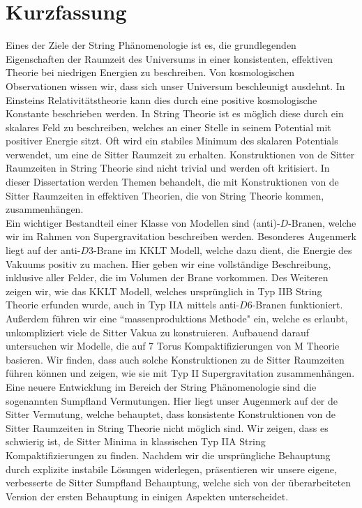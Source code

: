 \documentclass[a4paper,12pt,twoside,openright]{report}
\begin{document}
\newpage\thispagestyle{empty}\vspace*{\fill}
\null %
\vspace*{\fill}\newpage
\setcounter{page}{1}
\section*{Kurzfassung}
Eines der Ziele der String Phänomenologie ist es, die grundlegenden Eigenschaften der Raumzeit des Universums in einer konsistenten, effektiven Theorie bei niedrigen Energien zu beschreiben. Von kosmologischen Observationen wissen wir, dass sich unser Universum beschleunigt ausdehnt. In Einsteins Relativitätstheorie kann dies durch eine positive kosmologische Konstante beschrieben werden. In String Theorie ist es möglich diese durch ein skalares Feld zu beschreiben, welches an einer Stelle in seinem Potential mit positiver Energie sitzt. Oft wird ein stabiles Minimum des skalaren Potentials verwendet, um eine de Sitter Raumzeit zu erhalten. Konstruktionen von de Sitter Raumzeiten in String Theorie sind nicht trivial und werden oft kritisiert. In dieser Dissertation werden Themen behandelt, die mit Konstruktionen von de Sitter Raumzeiten in effektiven Theorien, die von String Theorie kommen, zusammenhängen.\\
Ein wichtiger Bestandteil einer Klasse von Modellen sind (anti)-$D$-Branen, welche wir im Rahmen von Supergravitation beschreiben werden. Besonderes Augenmerk liegt auf der anti-$D3$-Brane im KKLT Modell, welche dazu dient, die Energie des Vakuums positiv zu machen. Hier geben wir eine vollständige Beschreibung, inklusive aller Felder, die im Volumen der Brane vorkommen. Des Weiteren zeigen wir, wie das KKLT Modell, welches ursprünglich in Typ IIB String Theorie erfunden wurde, auch in Typ IIA mittels anti-$D6$-Branen funktioniert. Außerdem führen wir eine ``massenproduktions Methode" ein, welche es erlaubt, unkompliziert viele de Sitter Vakua zu konstruieren. Aufbauend darauf untersuchen wir Modelle, die auf 7 Torus Kompaktifizierungen von M Theorie basieren. Wir finden, dass auch solche Konstruktionen zu de Sitter Raumzeiten führen können und zeigen, wie sie mit Typ II Supergravitation zusammenhängen.\\
Eine neuere Entwicklung im Bereich der String Phänomenologie sind die sogenannten Sumpfland Vermutungen. Hier liegt unser Augenmerk auf der de Sitter Vermutung, welche behauptet, dass konsistente Konstruktionen von de Sitter Raumzeiten in String Theorie nicht möglich sind. Wir zeigen, dass es schwierig ist, de Sitter Minima in klassischen Typ IIA String Kompaktifizierungen zu finden. Nachdem wir die ursprüngliche Behauptung durch explizite instabile Lösungen widerlegen, präsentieren wir unsere eigene, verbesserte de Sitter Sumpfland Behauptung, welche sich von der überarbeiteten Version der ersten Behauptung in einigen Aspekten unterscheidet.\vspace{12pt}\\
\end{document}

